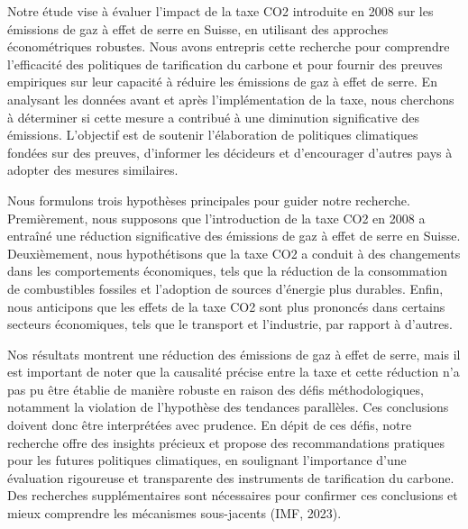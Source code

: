 Notre étude vise à évaluer l’impact de la taxe CO2 introduite en 2008 sur les émissions de gaz à effet de serre en Suisse, en utilisant des approches économétriques robustes. Nous avons entrepris cette recherche pour comprendre l’efficacité des politiques de tarification du carbone et pour fournir des preuves empiriques sur leur capacité à réduire les émissions de gaz à effet de serre. En analysant les données avant et après l’implémentation de la taxe, nous cherchons à déterminer si cette mesure a contribué à une diminution significative des émissions. L’objectif est de soutenir l’élaboration de politiques climatiques fondées sur des preuves, d’informer les décideurs et d’encourager d’autres pays à adopter des mesures similaires.


Nous formulons trois hypothèses principales pour guider notre recherche. Premièrement, nous supposons que l’introduction de la taxe CO2 en 2008 a entraîné une réduction significative des émissions de gaz à effet de serre en Suisse. Deuxièmement, nous hypothétisons que la taxe CO2 a conduit à des changements dans les comportements économiques, tels que la réduction de la consommation de combustibles fossiles et l’adoption de sources d’énergie plus durables. Enfin, nous anticipons que les effets de la taxe CO2 sont plus prononcés dans certains secteurs économiques, tels que le transport et l’industrie, par rapport à d’autres.

Nos résultats montrent une réduction des émissions de gaz à effet de serre, mais il est important de noter que la causalité précise entre la taxe et cette réduction n’a pas pu être établie de manière robuste en raison des défis méthodologiques, notamment la violation de l’hypothèse des tendances parallèles. Ces conclusions doivent donc être interprétées avec prudence. En dépit de ces défis, notre recherche offre des insights précieux et propose des recommandations pratiques pour les futures politiques climatiques, en soulignant l’importance d’une évaluation rigoureuse et transparente des instruments de tarification du carbone. Des recherches supplémentaires sont nécessaires pour confirmer ces conclusions et mieux comprendre les mécanismes sous-jacents (IMF, 2023)\supercite{imf2023}.

